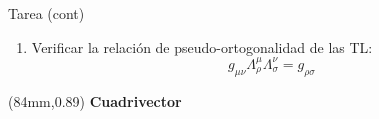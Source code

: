 \documentclass[xetex,mathserif,serif,10pt]{beamer}
\begin{document}
\begin{frame}
\begin{textblock*}{41mm}
{\begin{exampleblock}{\tiny{Tarea (cont)}}
\begin{enumerate}
          \item Verificar la relación de pseudo-ortogonalidad de las TL: \vspace{-2em}  
           \begin{equation}\label{EQorto}
             g_{\mu\nu} \Lambda^{\mu}_{\rho} \Lambda^{\nu}_{\sigma} = g_{\rho\sigma}
           \end{equation}\vspace{-3em}  
        \end{enumerate}
      \end{exampleblock}
    }
  \end{textblock*}
  \begin{textblock*}{41mm}(84mm,0.89\textheight)
    \Large{\alert{\bf{Cuadrivector}}}
  \end{textblock*}
\end{frame}
\end{document}

